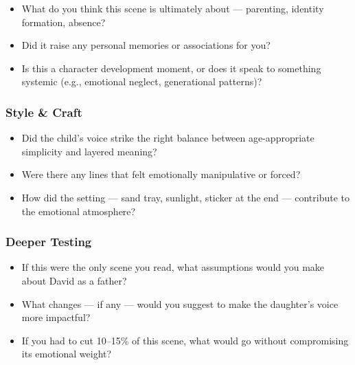 \begin{itemize}
  \item What do you think this scene is ultimately about — parenting, identity formation, absence?
  \item Did it raise any personal memories or associations for you?
  \item Is this a character development moment, or does it speak to something systemic (e.g., emotional neglect, generational patterns)?
\end{itemize}

\subsubsection*{Style \& Craft}

\begin{itemize}
  \item Did the child’s voice strike the right balance between age-appropriate simplicity and layered meaning?
  \item Were there any lines that felt emotionally manipulative or forced?
  \item How did the setting — sand tray, sunlight, sticker at the end — contribute to the emotional atmosphere?
\end{itemize}

\subsubsection*{Deeper Testing}

\begin{itemize}
  \item If this were the only scene you read, what assumptions would you make about David as a father?
  \item What changes — if any — would you suggest to make the daughter’s voice more impactful?
  \item If you had to cut 10–15\% of this scene, what would go without compromising its emotional weight?
\end{itemize}
